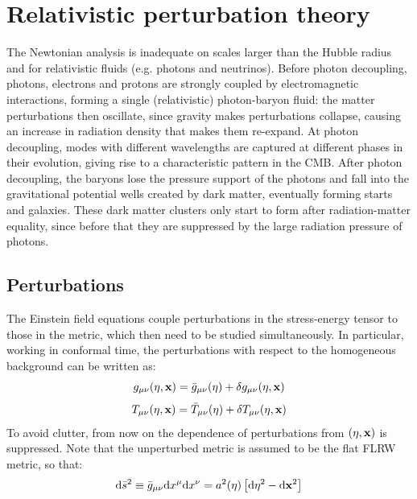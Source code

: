 \section{Relativistic perturbation theory}

The Newtonian analysis is inadequate on scales larger than the Hubble radius and for relativistic fluids (e.g. photons and neutrinos). Before photon decoupling, photons, electrons and protons are strongly coupled by electromagnetic interactions, forming a single (relativistic) photon-baryon fluid: the matter perturbations then oscillate, since gravity makes perturbations collapse, causing an increase in radiation density that makes them re-expand. At photon decoupling, modes with different wavelengths are captured at different phases in their evolution, giving rise to a characteristic pattern in the CMB. After photon decoupling, the baryons lose the pressure support of the photons and fall into the gravitational potential wells created by dark matter, eventually forming starts and galaxies. These dark matter clusters only start to form after radiation-matter equality, since before that they are suppressed by the large radiation pressure of photons.

\subsection{Perturbations}

The Einstein field equations  couple perturbations in the stress-energy tensor to those in the metric, which then need to be studied simultaneously. In particular, working in conformal time, the perturbations with respect to the homogeneous background can be written as:
\begin{equation}
  g_{\mu \nu}(\eta , \mathbf{x}) = \bar g_{\mu \nu}(\eta) + \delta g_{\mu \nu}(\eta , \mathbf{x})
\end{equation}
\begin{equation}
  T_{\mu \nu}(\eta , \mathbf{x}) = \bar T_{\mu \nu}(\eta) + \delta T_{\mu \nu}(\eta , \mathbf{x})
\end{equation}
To avoid clutter, from now on the dependence of perturbations from $ (\eta , \mathbf{x}) $ is suppressed. Note that the unperturbed metric is assumed to be the flat FLRW metric, so that:
\begin{equation*}
  \mathrm{d} \bar s^2 \equiv \bar g_{\mu \nu} \mathrm{d} x^\mu \mathrm{d} x^\nu = a^2(\eta) \left[ \mathrm{d} \eta^2 - \mathrm{d} \mathbf{x}^2 \right]
\end{equation*}

